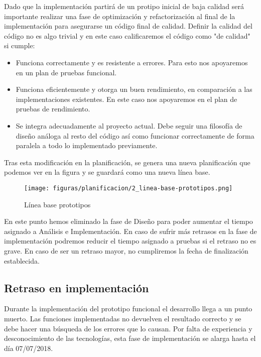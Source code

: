 Dado que la implementación partirá de un protipo inicial de baja calidad será importante realizar una fase de optimización y refactorización al final de la implementación para asegurarse un código final de calidad. Definir la calidad del código no es algo trivial y en este caso calificaremos el código como "de calidad" si cumple:

\begin{itemize}
    \item Funciona correctamente y es resistente a errores. Para esto nos apoyaremos en un plan de pruebas funcional.
    \item Funciona eficientemente y otorga un buen rendimiento, en comparación a las implementaciones existentes. En este caso nos apoyaremos en el plan de pruebas de rendimiento.
    \item Se integra adecuadamente al proyecto actual. Debe seguir una filosofía de diseño análoga al resto del código así como funcionar correctamente de forma paralela a todo lo implementado previamente.
\end{itemize}

Tras esta modificación en la planificación, se genera una nueva planificación que podemos ver en la figura y se guardará como una nueva línea base.

\begin{figure}[H]
    \centerline{\texttt{[image: figuras/planificacion/2\_linea-base-prototipos.png]}}
    \caption{Línea base prototipos}
\end{figure}

En este punto hemos eliminado la fase de Diseño para poder aumentar el tiempo asignado a Análisis e Implementación. En caso de sufrir más retrasos en la fase de implementación podremos reducir el tiempo asignado a pruebas si el retraso no es grave. En caso de ser un retraso mayor, no cumpliremos la fecha de finalización establecida.

\subsection{Retraso en implementación}

Durante la implementación del prototipo funcional el desarrollo llega a un punto muerto. Las funciones implementadas no devuelven el resultado correcto y se debe hacer una búsqueda de los errores que lo causan. Por falta de experiencia y desconocimiento de las tecnologías, esta fase de implementación se alarga hasta el día 07/07/2018. \\

